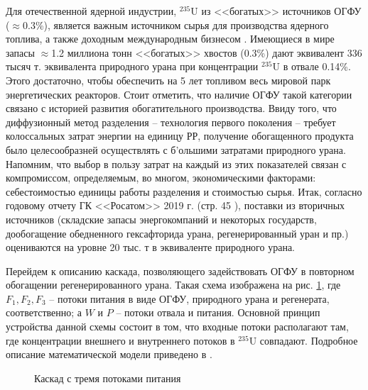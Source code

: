 Для отечественной ядерной индустрии, $^{235}$U из <<богатых>> источников ОГФУ ($\approx$0.3\%), является важным источником сырья для производства ядерного топлива, а также доходным международным бизнесом \cite{oecdManagementDepletedUranium2001}.
Имеющиеся в мире запасы $\approx$1.2 миллиона тонн <<богатых>> хвостов (0.3\%) дают эквивалент 336 тысяч т. эквивалента природного урана при концентрации $^{235}$U в отвале 0.14\%. Этого достаточно, чтобы обеспечить на 5 лет топливом весь мировой парк энергетических реакторов.
Стоит отметить, что наличие ОГФУ такой категории связано с историей развития обогатительного производства. Ввиду того, что диффузионный метод разделения -- технология первого поколения -- требует колоссальных затрат энергии на единицу РР, получение обогащенного продукта было целесообразней осуществлять с б'ольшими затратами природного урана.
Напомним, что выбор в пользу затрат на каждый из этих показателей связан с компромиссом, определяемым, во многом, экономическими факторами: себестоимостью единицы работы разделения и стоимостью сырья. 
Итак, согласно годовому отчету ГК <<Росатом>> 2019 г. (стр. 45 \cite{ITOGIDEYaTELNOSTIGOSUDARSTVENNOY}), поставки из вторичных источников (складские запасы энергокомпаний и некоторых государств, дообогащение обедненного гексафторида урана, регенерированный уран и пр.) оцениваются на уровне 20 тыс. т в эквиваленте природного урана.

Перейдем к описанию каскада, позволяющего задействовать ОГФУ в повторном обогащении регенерированного урана.
Такая схема изображена на рис. \ref{fig:3_inputs}, где $F_{1}, F_{2}, F_{3}$ -- потоки питания в виде ОГФУ, природного урана и регенерата, соответственно; а $W$ и $P$ -- потоки отвала и питания.
Основной принцип устройства данной схемы состоит в том, что входные потоки располагают там, где концентрации внешнего и внутреннего потоков в $^{235}$U совпадают.
Подробное описание математической модели приведено в \cite{smirnovEnrichmentRegeneratedUranium2014}.

\begin{figure}[ht]
  \caption{Каскад с тремя потоками питания}\label{fig:3_inputs}
\end{figure}

